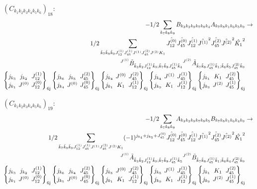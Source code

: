 \documentclass[11pt]{article}
\newcommand{\sixj}[6]{\begingroup\setlength{\arraycolsep}{0.2em}\begin{Bmatrix} #1 & #2 & #3 \\ #4 & #5 & #6 \end{Bmatrix}_{\text{6j}}\endgroup}
\begin{document}
$\left({C}_{{k}_{1}{k}_{2}{k}_{3}{k}_{4}{k}_{5}{k}_{6}}\right)_{18}$:
\begin{align}
-1/2\sum_{{k}_{7}{k}_{8}{k}_{9}}{B}_{{k}_{3}{k}_{2}{k}_{9}{k}_{7}{k}_{8}{k}_{4}}{A}_{{k}_{7}{k}_{8}{k}_{1}{k}_{6}{k}_{5}{k}_{9}}&\rightarrow \notag \\1/2\sum_{\tilde{k}_{7}\tilde{k}_{8}\tilde{k}_{9}J^{(1)}_{12}J^{(1)}_{45}J^{(1)}J^{(2)}_{45}J^{(2)}K_{1}}\hat{J^{(0)}_{12}}\hat{J^{(0)}_{45}}\hat{J^{(1)}_{12}}\hat{J^{(1)}}^{2}\hat{J^{(2)}_{45}}\hat{J^{(2)}}^{2}\hat{K_{1}}^{2}& \notag \\{}^{J^{(1)}}\tilde{B}_{\tilde{k}_{3}\tilde{k}_{2}J^{(1)}_{12}\tilde{k}_{9};\tilde{k}_{7}\tilde{k}_{8}J^{(1)}_{45}\tilde{k}_{4}}{}^{J^{(2)}}\tilde{A}_{\tilde{k}_{7}\tilde{k}_{8}J^{(1)}_{45}\tilde{k}_{1};\tilde{k}_{6}\tilde{k}_{5}J^{(2)}_{45}\tilde{k}_{9}}& \notag \\\sixj{j_{{k}_{3}}}{j_{{k}_{2}}}{J^{(1)}_{12}}{j_{{k}_{1}}}{J^{(0)}}{J^{(0)}_{12}}\sixj{j_{{k}_{6}}}{j_{{k}_{5}}}{J^{(2)}_{45}}{j_{{k}_{4}}}{J^{(0)}}{J^{(0)}_{45}}\sixj{j_{{k}_{4}}}{J^{(0)}}{J^{(2)}_{45}}{j_{{k}_{1}}}{K_{1}}{J^{(1)}_{12}}\sixj{j_{{k}_{4}}}{J^{(1)}}{J^{(1)}_{45}}{j_{{k}_{9}}}{K_{1}}{J^{(1)}_{12}}\sixj{j_{{k}_{1}}}{K_{1}}{J^{(2)}_{45}}{j_{{k}_{9}}}{J^{(2)}}{J^{(1)}_{45}}
\end{align}

$\left({C}_{{k}_{1}{k}_{2}{k}_{3}{k}_{4}{k}_{5}{k}_{6}}\right)_{19}$:
\begin{align}
-1/2\sum_{{k}_{7}{k}_{8}{k}_{9}}{A}_{{k}_{3}{k}_{2}{k}_{9}{k}_{7}{k}_{8}{k}_{5}}{B}_{{k}_{7}{k}_{8}{k}_{1}{k}_{6}{k}_{4}{k}_{9}}&\rightarrow \notag \\1/2\sum_{\tilde{k}_{7}\tilde{k}_{8}\tilde{k}_{9}J^{(1)}_{12}J^{(1)}_{45}J^{(1)}J^{(2)}_{45}J^{(2)}K_{1}}(-1)^{j_{{k}_{4}} +j_{{k}_{5}} +J^{(0)}_{45} }\hat{J^{(0)}_{12}}\hat{J^{(0)}_{45}}\hat{J^{(1)}_{12}}\hat{J^{(1)}}^{2}\hat{J^{(2)}_{45}}\hat{J^{(2)}}^{2}\hat{K_{1}}^{2}& \notag \\{}^{J^{(1)}}\tilde{A}_{\tilde{k}_{3}\tilde{k}_{2}J^{(1)}_{12}\tilde{k}_{9};\tilde{k}_{7}\tilde{k}_{8}J^{(1)}_{45}\tilde{k}_{5}}{}^{J^{(2)}}\tilde{B}_{\tilde{k}_{7}\tilde{k}_{8}J^{(1)}_{45}\tilde{k}_{1};\tilde{k}_{6}\tilde{k}_{4}J^{(2)}_{45}\tilde{k}_{9}}& \notag \\\sixj{j_{{k}_{3}}}{j_{{k}_{2}}}{J^{(1)}_{12}}{j_{{k}_{1}}}{J^{(0)}}{J^{(0)}_{12}}\sixj{j_{{k}_{6}}}{j_{{k}_{4}}}{J^{(2)}_{45}}{j_{{k}_{5}}}{J^{(0)}}{J^{(0)}_{45}}\sixj{j_{{k}_{5}}}{J^{(0)}}{J^{(2)}_{45}}{j_{{k}_{1}}}{K_{1}}{J^{(1)}_{12}}\sixj{j_{{k}_{5}}}{J^{(1)}}{J^{(1)}_{45}}{j_{{k}_{9}}}{K_{1}}{J^{(1)}_{12}}\sixj{j_{{k}_{1}}}{K_{1}}{J^{(2)}_{45}}{j_{{k}_{9}}}{J^{(2)}}{J^{(1)}_{45}}
\end{align}
\end{document}
